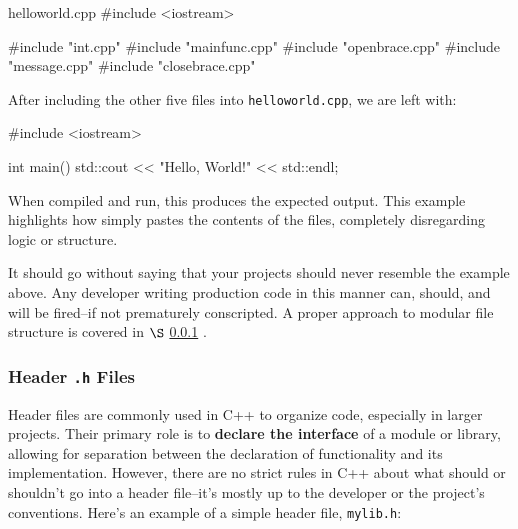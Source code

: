 \documentclass[12pt]{article}
\begin{document}
\begin{cxx}{closebrace.cpp}
}
\end{cxx}

\begin{cxx}{helloworld.cpp}
#include <iostream>

#include "int.cpp"
#include "mainfunc.cpp"
#include "openbrace.cpp"
#include "message.cpp"
#include "closebrace.cpp"
\end{cxx}


\begin{explanation}
After including the other five files into \texttt{helloworld.cpp}, we are left with:

\begin{cxx}{}
#include <iostream>

int
main()
{
std::cout << "Hello, World!" << std::endl;
}
\end{cxx}

\noindent
When compiled and run, this produces the expected output. This example highlights how  simply pastes the contents of the files, completely disregarding logic or structure.
\end{explanation}

\noindent
It should go without saying that your projects should never resemble the example above.
Any developer writing production code in this manner can, should, and will be fired--if not prematurely conscripted.
A proper approach to modular file structure is covered in $\S$ \ref{sec:header-files} .

\subsubsection{Header \texttt{.h} Files}
\label{sec:header-files}

\noindent
Header files are commonly used in C++ to organize code, especially in larger projects.
Their primary role is to \textbf{declare the interface} of a module or library, allowing for separation between the declaration of functionality and its implementation.
However, there are no strict rules in C++ about what should or shouldn't go into a header file--it's mostly up to the developer or the project's conventions.
Here's an example of a simple header file, \texttt{mylib.h}:
\end{document}
